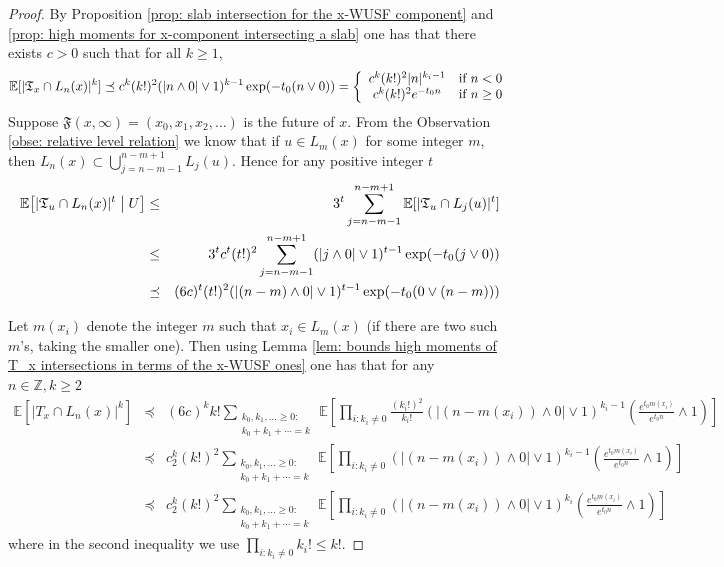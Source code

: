 \documentclass[12pt]{article}
\numberwithin{equation}{section}
\newcommand{\be}{\begin{equation}}
\newcommand{\ee}{\end{equation}}
\newcommand{\1}{\mathbf{1}}
\begin{document}
\begin{proof}
		By Proposition \ref{prop: slab intersection for the x-WUSF component} and \ref{prop: high moments for x-component intersecting a slab} one has that there exists $c>0$ such that for all $k\geq1$,
	\be\label{eq: all moments for x-wusf intersect with L_n(x)}
	\mathbb{E}[|\mathfrak{T}_{x}\cap L_n(x)|^k]\preceq 
	c^k(k!)^2(|n\wedge0|\vee1)^{k-1}\exp(-t_0(n\vee0))=
	\left\{
	\begin{array}{cc}
		c^k(k!)^2|n|^{k_i-1} & \textnormal{if }n<0\\
		c^k(k!)^2e^{-t_0n} & \textnormal{if }n\geq 0
	\end{array}
	\right.
	\ee
	Suppose  $\mathfrak{F}(x,\infty)=(x_0,x_1,x_2,\ldots)$ is the future of $x$.  From the Observation \ref{obse: relative level relation} we know that if $u\in L_m(x)$ for some integer $m$, then $L_n(x)\subset  \bigcup_{j=n-m-1}^{n-m+1}L_j(u)$. Hence for any positive integer $t$
    \begin{eqnarray*}
	\mathbb{E}\big[|\mathfrak{T}_{u}\cap L_n(x)|^t\bigm|U\big]
	&\leq& 3^t \sum_{j=n-m-1}^{n-m+1}\mathbb{E}[|\mathfrak{T}_{u}\cap L_j(u)|^t]\\
	&\leq& 3^tc^t(t!)^{2} \sum_{j=n-m-1}^{n-m+1}(|j\wedge0|\vee 1)^{t-1}\exp(-t_0(j\vee 0))\nonumber\\
	&\preceq& (6c)^t(t!)^{2}(|(n-m)\wedge0|\vee 1)^{t-1}\exp(-t_0(0\vee(n-m)))
	\end{eqnarray*}

Let $m(x_i)$ denote the integer $m$ such that $x_i\in L_{m}(x)$ (if there are two such $m$'s, taking the smaller one). Then using Lemma \ref{lem: bounds high moments of T_x intersections in terms of the x-WUSF ones}
one has that for any $n\in\mathbb{Z},k\geq 2$
\begin{eqnarray}\label{eq: 4.49 in terms of S_t}
\mathbb{E}[|T_x\cap L_n(x)|^k]
&\preceq&
(6c)^kk! \sum_{\substack{k_0,k_1,\ldots \geq 0:\\ k_0+ k_1+\cdots  =k}} \,\mathbb{E}\left[ \prod_{i:k_i\neq 0} \frac{(k_i!)^{2}}{k_i!}
(|(n-m(x_i))\wedge0|\vee 1)^{k_i-1}\left(\frac{e^{t_0m(x_i)}}{e^{t_0n}}\wedge1\right)\right]\nonumber\\
&\preceq&c_{2}^k(k!)^2\sum_{\substack{k_0,k_1,\ldots \geq 0:\\ k_0+ k_1+\cdots  =k}} \,\mathbb{E}\left[ \prod_{i:k_i\neq 0} 
(|(n-m(x_i))\wedge0|\vee 1)^{k_i-1}\left(\frac{e^{t_0m(x_i)}}{e^{t_0n}}\wedge1\right)\right]\nonumber\\
&\preceq&c_{2}^k(k!)^2\sum_{\substack{k_0,k_1,\ldots \geq 0:\\ k_0+ k_1+\cdots  =k}} \,\mathbb{E}\left[ \prod_{i:k_i\neq 0} 
(|(n-m(x_i))\wedge0|\vee 1)^{k_i}\left(\frac{e^{t_0m(x_i)}}{e^{t_0n}}\wedge1\right)\right]
\end{eqnarray} 
	where in the second inequality we use $\prod_{i:k_i\neq0}k_i!\leq k!$.
	

\end{proof}
\end{document}
